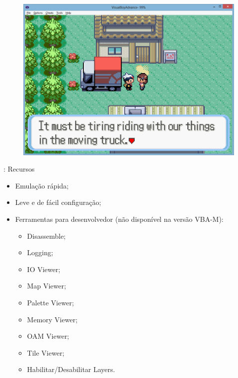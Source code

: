 \documentclass{beamer}
\begin{document}
\begin{darkframes}
\begin{frame}{\subsecname}
    \begin{figure}
        \centering
        \includegraphics[width=1\textwidth,height=0.5\textheight,keepaspectratio]{game_example}
    \end{figure}
\end{frame}

\begin{frame}{\subsecname: Recursos}
    \begin{itemize}
        \item Emulação rápida;
        \item Leve e de fácil configuração;
        \item Ferramentas para desenvolvedor (não disponível na versão VBA-M):
            \begin{itemize}
                \item Disassemble;
                \item Logging;
                \item IO Viewer;
                \item Map Viewer;
                \item Palette Viewer;
                \item Memory Viewer;
                \item OAM Viewer;
                \item Tile Viewer;
                \item Habilitar/Desabilitar Layers.
            \end{itemize}
    \end{itemize}
\end{frame}


\end{darkframes}
\end{document}

